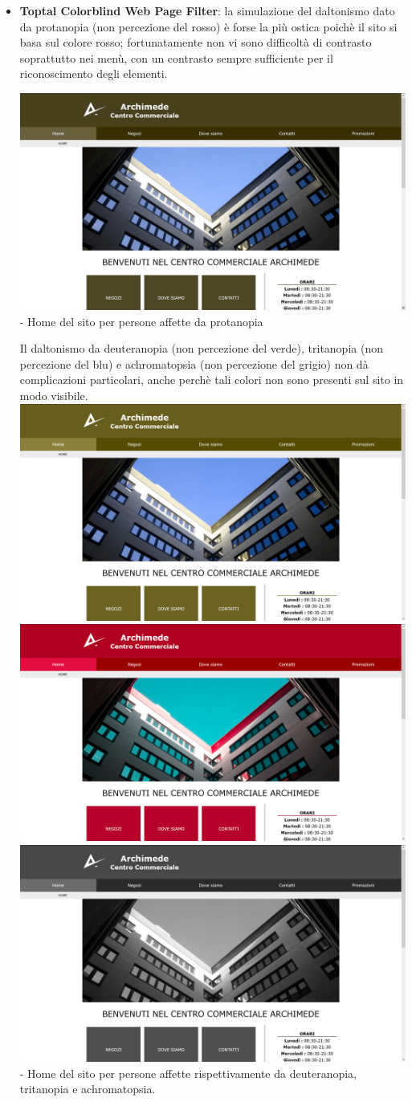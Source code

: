 \documentclass[a4paper,12pt]{article}
\begin{document}
\begin{itemize}
\newpage	
	\item \textbf{Toptal Colorblind Web Page Filter}: la simulazione del daltonismo dato da protanopia (non percezione del rosso) è forse la più ostica poichè il sito si basa sul colore rosso; fortunatamente non vi sono difficoltà di contrasto soprattutto nei menù, con un contrasto sempre sufficiente per il riconoscimento degli elementi.\\
	\vskip1cm
	\begin{center}
		\includegraphics[width=0.7\linewidth]{images/protanopia}\\
		\vskip1cm
		- Home del sito per persone affette da protanopia
	\end{center}
	\vskip1cm
	Il daltonismo da deuteranopia (non percezione del verde), tritanopia (non percezione del blu) e achromatopsia (non percezione del grigio) non dà complicazioni particolari, anche perchè tali colori non sono presenti sul sito in modo visibile.
	\vskip1cm
	\includegraphics[width=0.3\linewidth]{images/deuteranopia}
	\includegraphics[width=0.3\linewidth]{images/tritanopia}
	\includegraphics[width=0.3\linewidth]{images/achromatopsia}\\
	\vskip1cm
	- Home del sito per persone affette rispettivamente da deuteranopia, tritanopia e achromatopsia.
	
	\end{itemize}
\newpage
\end{document}
